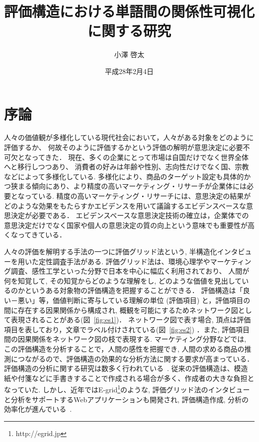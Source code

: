 \documentclass[syuuron]{kuee}
\title{評価構造における単語間の関係性可視化に関する研究}
\author{小澤 啓太}
\date{平成28年2月4日}
\begin{document}
\maketitle
\tableofcontents


\chapter{序論}
	人々の価値観が多様化している現代社会において，人々がある対象をどのように評価するか、
	何故そのように評価するかという評価の解明が意思決定に必要不可欠となってきた．
	現在、多くの企業にとって市場は自国だけでなく世界全体へと移行しつつあり、
	消費者の好みは年齢や性別、志向性だけでなく国、宗教などによって多様化している. 
	多様化により、商品のターゲット設定も具体的かつ狭まる傾向にあり、より精度の高いマーケティング・リサーチが企業体には必要となっている. 
	精度の高いマーケティング・リサーチには、意思決定の結果がどのような効果をもたらすかエビデンスを用いて議論するエビデンスベースな意思決定が必要である．
	エビデンスベースな意思決定技術の確立は，企業体での意思決定だけでなく国家や個人の意思決定の質の向上という意味でも重要性が高くなってきている．
	
	人々の評価を解明する手法の一つに評価グリッド法という, 半構造化インタビューを用いた定性調査手法がある. 
	評価グリッド法は、環境心理学やマーケティング調査、感性工学といった分野で日本を中心に幅広く利用されており、
	人間が何を知覚して, その知覚からどのような理解をし, どのような価値を見出しているのかというある対象物の評価構造を把握することができる．
	評価構造は「良い－悪い」等，価値判断に寄与している理解の単位 (評価項目) と，評価項目の間に存在する因果関係から構成され, 
	概観を可能にするためネットワーク図として表現されることがある(図~\ref{fig:es1})．
	ネットワーク図で表す場合, 頂点は評価項目を表しており，文章でラベル付けされている(図~\ref{fig:es2}) ．また, 評価項目間の因果関係をネットワーク図の枝で表現する. 
	マーケティング分野などでは, この評価構造を分析することで，人間の感性を把握でき, 人間の求める商品の推測につながるので、評価構造の効果的な分析方法に関する要求が高まっている\cite{egm6, egm7}．
	評価構造の分析に関する研究は数多く行われている~\cite{egm8, egm9}. 
	従来の評価構造は、模造紙や付箋などに手書きすることで作成される場合が多く、作成者の大きな負担となっていた. 
	しかし、近年ではE-grid\footnote{http://egrid.jp}のような, 評価グリッド法のインタビューと分析をサポートするWebアプリケーションも開発され, 評価構造作成, 分析の効率化が進んでいる~\cite{egm5, egm6}. 
	
\end{document}
